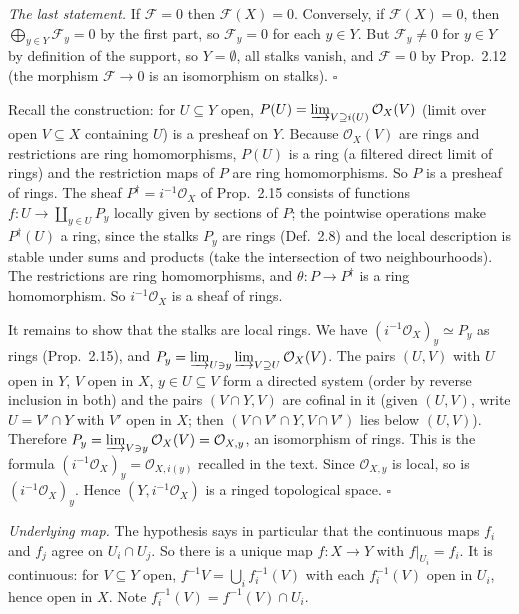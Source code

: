 \documentclass[11pt]{article}
\begin{document}
\emph{The last statement.} If $\mathcal{F}=0$ then $\mathcal{F}(X)=0$. Conversely, if $\mathcal{F}(X)=0$, then $\bigoplus_{y\in Y}\mathcal{F}_y=0$ by the first part, so $\mathcal{F}_y=0$ for each $y\in Y$. But $\mathcal{F}_y\neq0$ for $y\in Y$ by definition of the support, so $Y=\emptyset$, all stalks vanish, and $\mathcal{F}=0$ by Prop.~2.12 (the morphism $\mathcal{F}\to0$ is an isomorphism on stalks). \hfill$\square$

\pf
Recall the construction: for $U\subseteq Y$ open, $P(U)=\varinjlim_{V\supseteq i(U)}\mathcal{O}_X(V)$ (limit over open $V\subseteq X$ containing $U$) is a presheaf on $Y$. Because $\mathcal{O}_X(V)$ are rings and restrictions are ring homomorphisms, $P(U)$ is a ring (a filtered direct limit of rings) and the restriction maps of $P$ are ring homomorphisms. So $P$ is a presheaf of rings. The sheaf $P^\dagger=i^{-1}\mathcal{O}_X$ of Prop.~2.15 consists of functions $f:U\to\coprod_{y\in U}P_y$ locally given by sections of $P$; the pointwise operations make $P^\dagger(U)$ a ring, since the stalks $P_y$ are rings (Def.~2.8) and the local description is stable under sums and products (take the intersection of two neighbourhoods). The restrictions are ring homomorphisms, and $\theta:P\to P^\dagger$ is a ring homomorphism. So $i^{-1}\mathcal{O}_X$ is a sheaf of rings.

It remains to show that the stalks are local rings. We have $(i^{-1}\mathcal{O}_X)_y\simeq P_y$ as rings (Prop.~2.15), and $P_y=\varinjlim_{U\ni y}\varinjlim_{V\supseteq U}\mathcal{O}_X(V)$. The pairs $(U,V)$ with $U$ open in $Y$, $V$ open in $X$, $y\in U\subseteq V$ form a directed system (order by reverse inclusion in both) and the pairs $(V\cap Y,V)$ are cofinal in it (given $(U,V)$, write $U=V'\cap Y$ with $V'$ open in $X$; then $(V\cap V'\cap Y,V\cap V')$ lies below $(U,V)$). Therefore $P_y=\varinjlim_{V\ni y}\mathcal{O}_X(V)=\mathcal{O}_{X,y}$, an isomorphism of rings. This is the formula $(i^{-1}\mathcal{O}_X)_y=\mathcal{O}_{X,i(y)}$ recalled in the text. Since $\mathcal{O}_{X,y}$ is local, so is $(i^{-1}\mathcal{O}_X)_y$. Hence $(Y,i^{-1}\mathcal{O}_X)$ is a ringed topological space. \hfill$\square$

\pf
\emph{Underlying map.} The hypothesis says in particular that the continuous maps $f_i$ and $f_j$ agree on $U_i\cap U_j$. So there is a unique map $f:X\to Y$ with $f|_{U_i}=f_i$. It is continuous: for $V\subseteq Y$ open, $f^{-1}V=\bigcup_i f_i^{-1}(V)$ with each $f_i^{-1}(V)$ open in $U_i$, hence open in $X$. Note $f_i^{-1}(V)=f^{-1}(V)\cap U_i$.
\end{document}
